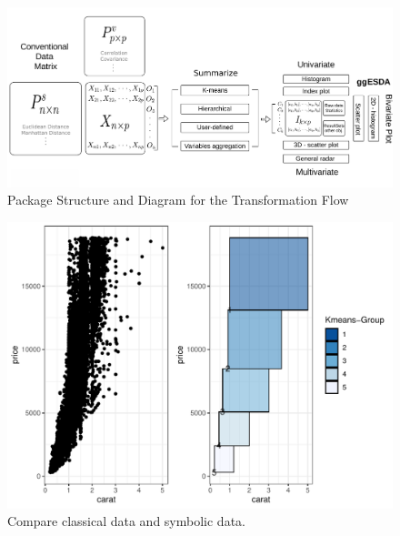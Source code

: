 \documentclass[article]{jss}
\begin{document}
\begin{appendix}
\begin{figure}[t!]
\centering	 			 	
\includegraphics[width=1\textwidth]{pic/packageStructure2} 
\caption{\label{fig:pkgStr} Package Structure and Diagram for the Transformation Flow}  
\end{figure}



\begin{figure}[t!]
\centering
\includegraphics[width=1\textwidth]{pic/compare} 
\caption{\label{fig:compare} Compare classical data and symbolic data.}
\end{figure}




\end{appendix}
\end{document}
